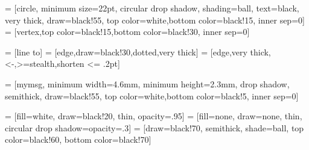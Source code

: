  = [circle, minimum size=22pt, circular drop shadow, shading=ball, text=black, very thick, draw=black!55, top color=white,bottom color=black!15, inner sep=0]
 = [vertex,top color=black!15,bottom color=black!30, inner sep=0]

 = [line to]
 = [edge,draw=black!30,dotted,very thick]
 = [edge,very thick,<-,>=stealth,shorten <= .2pt]


\makeatletter


 = [mymsg, minimum width=4.6mm, minimum height=2.3mm, drop shadow, semithick, draw=black!55, top color=white,bottom color=black!5, inner sep=0]

 =  [fill=white, draw=black!20, thin, opacity=.95]
 = [fill=none, draw=none, thin, circular drop shadow={opacity=.3}]
 =   [draw=black!70, semithick, shade=ball, top color=black!60, bottom color=black!70]

